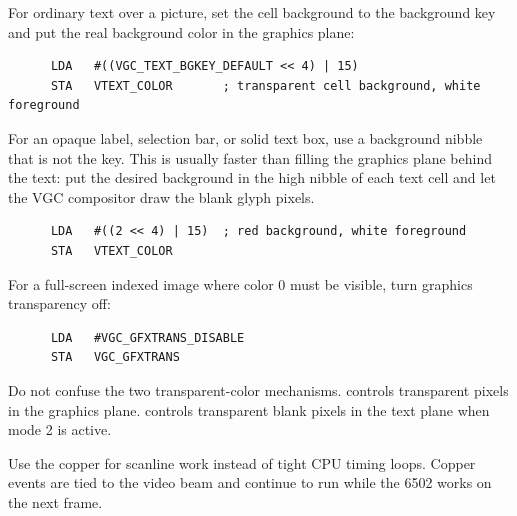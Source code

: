 For ordinary text over a picture, set the cell background to the background key
and put the real background color in the graphics plane:

\begin{lstlisting}
      LDA   #((VGC_TEXT_BGKEY_DEFAULT << 4) | 15)
      STA   VTEXT_COLOR       ; transparent cell background, white foreground
\end{lstlisting}

For an opaque label, selection bar, or solid text box, use a background nibble
that is not the key. This is usually faster than filling the graphics plane
behind the text: put the desired background in the high nibble of each text
cell and let the VGC compositor draw the blank glyph pixels.

\begin{lstlisting}
      LDA   #((2 << 4) | 15)  ; red background, white foreground
      STA   VTEXT_COLOR
\end{lstlisting}

For a full-screen indexed image where color 0 must be visible, turn graphics
transparency off:

\begin{lstlisting}
      LDA   #VGC_GFXTRANS_DISABLE
      STA   VGC_GFXTRANS
\end{lstlisting}

Do not confuse the two transparent-color mechanisms. 
controls transparent pixels in the graphics plane. 
controls transparent blank pixels in the text plane when mode 2 is active.

Use the copper for scanline work instead of tight CPU timing loops. Copper
events are tied to the video beam and continue to run while the 6502 works on
the next frame.
